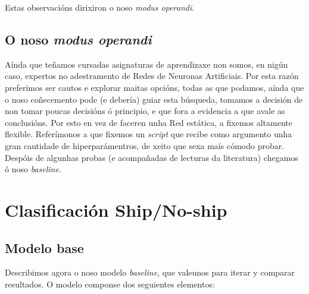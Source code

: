\documentclass{article}
\begin{document}
Estas observacións dirixiron o noso \emph{modus operandi}.

\subsection{O noso \emph{modus operandi}}

Aínda que teñamos cursadas asignaturas de aprendizaxe non somos, en nigún caso, expertos no adestramento de Redes de Neuronas Artificiais. Por esta razón preferimos ser cautos e explorar maitas opcións, todas as que podamos, aínda que o noso coñecemento pode (e debería) guiar esta búsqueda, tomamos a decisión de non tomar poucas decisións ó principio, e que fora a evidencia a que avale as conclusións. Por esto en vez de faceren unha Red estática, a fixemos altamente flexible. Referímonos a que fixemos un \emph{script} que recibe como argumento unha gran cantidade de hiperparámentros, de xeito que sexa maís cómodo probar. Despóis de algunhas probas (e acompañadas de lecturas da literatura) chegamos ó noso \emph{baseline}.

\section{Clasificación Ship/No-ship}
\subsection{Modelo base}

Describimos agora o noso modelo \emph{baseline}, que valeunos para iterar y comparar resultados. O modelo componse dos seguientes elementos:
\end{document}
